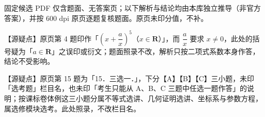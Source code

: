 \begin{gktip}
固定候选 PDF 仅含题面、无答案页；以下解析与结论均由本库独立推导（非官方答案），并按 600 dpi 原页逐题复核题面。原页未印分值，不补。

【源疑点】原页第 4 题印作「$\left(x+\dfrac ax\right)^5$（$x\in\mathbf R$）」，而 $\dfrac ax$ 要求 $x\neq 0$，此处的括号疑为「$a\in\mathbf R$」之误印或衍文；题面照录不改，解析只按二项式系数本身作答，结论不受影响。

【源疑点】原页第 15 题为「15．三选一．」，下分【A】【B】【C】三小题，未印「选考题」栏目名，也未印「考生只能从 A、B、C 三题中任选一题作答」的说明；按课标卷体例这三小题分属不等式选讲、几何证明选讲、坐标系与参数方程，属选修模块选考。此处照录，不改栏目名。
\end{gktip}

